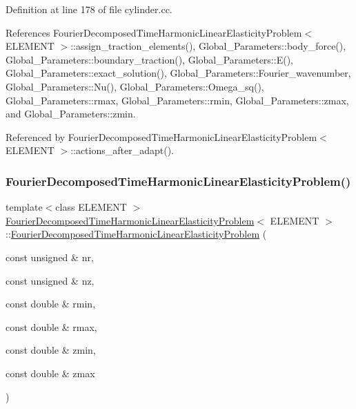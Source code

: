 Definition at line 178 of file cylinder.\+cc.



References Fourier\+Decomposed\+Time\+Harmonic\+Linear\+Elasticity\+Problem$<$ E\+L\+E\+M\+E\+N\+T $>$\+::assign\+\_\+traction\+\_\+elements(), Global\+\_\+\+Parameters\+::body\+\_\+force(), Global\+\_\+\+Parameters\+::boundary\+\_\+traction(), Global\+\_\+\+Parameters\+::\+E(), Global\+\_\+\+Parameters\+::exact\+\_\+solution(), Global\+\_\+\+Parameters\+::\+Fourier\+\_\+wavenumber, Global\+\_\+\+Parameters\+::\+Nu(), Global\+\_\+\+Parameters\+::\+Omega\+\_\+sq(), Global\+\_\+\+Parameters\+::rmax, Global\+\_\+\+Parameters\+::rmin, Global\+\_\+\+Parameters\+::zmax, and Global\+\_\+\+Parameters\+::zmin.



Referenced by Fourier\+Decomposed\+Time\+Harmonic\+Linear\+Elasticity\+Problem$<$ E\+L\+E\+M\+E\+N\+T $>$\+::actions\+\_\+after\+\_\+adapt().

\mbox{\label{classFourierDecomposedTimeHarmonicLinearElasticityProblem_a52597ec969cbd2aaa9fde263594c1c32}} 
\subsubsection{\texorpdfstring{Fourier\+Decomposed\+Time\+Harmonic\+Linear\+Elasticity\+Problem()}{FourierDecomposedTimeHarmonicLinearElasticityProblem()}\hspace{0.1cm}{\footnotesize\ttfamily [2/3]}}
{\footnotesize\ttfamily template$<$class E\+L\+E\+M\+E\+NT $>$ \\
\hyperlink{classFourierDecomposedTimeHarmonicLinearElasticityProblem}{Fourier\+Decomposed\+Time\+Harmonic\+Linear\+Elasticity\+Problem}$<$ E\+L\+E\+M\+E\+NT $>$\+::\hyperlink{classFourierDecomposedTimeHarmonicLinearElasticityProblem}{Fourier\+Decomposed\+Time\+Harmonic\+Linear\+Elasticity\+Problem} (\begin{DoxyParamCaption}\item[{const unsigned \&}]{nr,  }\item[{const unsigned \&}]{nz,  }\item[{const double \&}]{rmin,  }\item[{const double \&}]{rmax,  }\item[{const double \&}]{zmin,  }\item[{const double \&}]{zmax }\end{DoxyParamCaption})}



